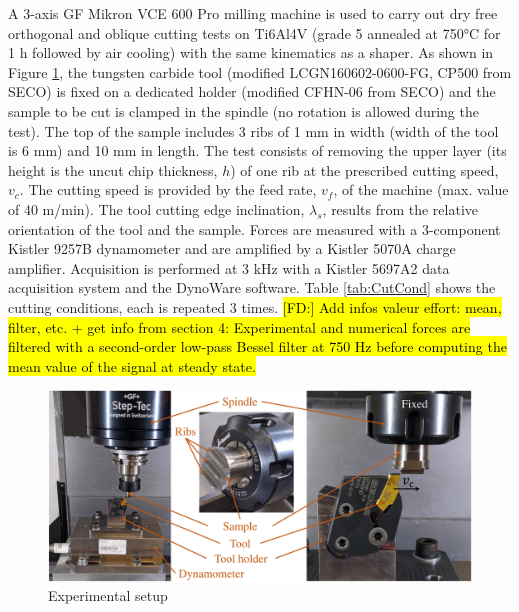 \documentclass[final,5p,times,twocolumn]{elsarticle}
\DeclareRobustCommand{\FD}[1]{ {\begingroup\sethlcolor{VWgreen}\textcolor{black}{\hl{[FD:] #1}}\endgroup} }
\begin{document}
A 3-axis GF Mikron VCE 600 Pro milling machine is used to carry out dry free orthogonal and oblique cutting tests on Ti6Al4V (grade 5 annealed at 750°C for 1 h followed by air cooling) with the same kinematics as a shaper. As shown in Figure \ref{ExpSetup}, the tungsten carbide tool (modified LCGN160602-0600-FG, CP500 from SECO) is fixed on a dedicated holder (modified CFHN-06 from SECO) and the sample to be cut is clamped in the spindle (no rotation is allowed during the test). The top of the sample includes 3 ribs of 1 mm in width (width of the tool is 6 mm) and 10 mm in length. The test consists of removing the upper layer (its height is the uncut chip thickness, $h$) of one rib at the prescribed cutting speed, $v_c$. The cutting speed is provided by the feed rate, $v_f$, of the machine (max. value of 40 m/min). The tool cutting edge inclination, $\lambda_s$, results from the relative orientation of the tool and the sample. Forces are measured with a 3-component Kistler 9257B dynamometer and are amplified by a Kistler 5070A charge amplifier. Acquisition is performed at 3 kHz with a Kistler 5697A2 data acquisition system and the DynoWare software. Table \ref{tab:CutCond} shows the cutting conditions, each is repeated 3 times. \FD{Add infos valeur effort: mean, filter, etc. + get info from section 4: Experimental and numerical forces are filtered with a second-order low-pass Bessel filter at 750 Hz before computing the mean value of the signal at steady state.}

\begin{figure}[h]
\centering
\includegraphics[width=\columnwidth]{Figures/ExpSetup}
\caption{Experimental setup}
\label{ExpSetup}
\end{figure}
\end{document}

